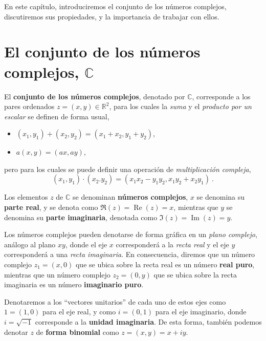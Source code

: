 En este capítulo, introduciremos el conjunto de los números complejos, discutiremos sus propiedades, y la importancia de trabajar con ellos.

\section{El conjunto de los números complejos, $\mathbb{C}$}

\begin{defi}
    El \textbf{conjunto de los números complejos}, denotado por $\mathbb{C}$, corresponde a los pares ordenados $z = (x,y) \in \mathbb{R}^2$, para los cuales la \emph{suma} y el \emph{producto por un escalar} se definen de forma usual,
    \begin{itemize}
        \item $(x_1, y_1) + (x_2, y_2) = (x_1 + x_2, y_1 + y_2)$,
        \item $a(x, y) = (ax, ay)$,
    \end{itemize}
    pero para los cuales se puede definir una operación de \emph{multiplicación compleja},
    \begin{equation}
        (x_1, y_1) \cdot (x_2. y_2) = (x_1 x_2 - y_1 y_2, x_1 y_2 + x_2 y _1) \ .
    \end{equation}

    Los elementos $z$ de $\mathbb{C}$ se denominan \textbf{números complejos}, $x$ se denomina su \textbf{parte real}, y se denota como $\Re{(z)} = \operatorname{Re}{(z)} = x$, mientras que $y$ se denomina su \textbf{parte imaginaria}, denotada como $\Im{(z)} = \operatorname{Im}{(z)} = y$.
\end{defi}

Los números complejos pueden denotarse de forma gráfica en un \emph{plano complejo}, análogo al plano $xy$, donde el eje $x$ corresponderá a la \emph{recta real} y el eje $y$ corresponderá a una \emph{recta imaginaria}. En consecuencia, diremos que un número complejo $z_1 = (x,0)$ que se ubica sobre la recta real es un número \textbf{real puro}, mientras que un número complejo $z_2 = (0, y)$ que se ubica sobre la recta imaginaria es un número \textbf{imaginario puro}. 

Denotaremos a los ``vectores unitarios'' de cada uno de estos ejes como $1 = (1,0)$ para el eje real, y como $i = (0,1)$ para el eje imaginario, donde $i = \sqrt{-1}$ corresponde a la \textbf{unidad imaginaria}. De esta forma, también podemos denotar $z$ de \textbf{forma binomial} como $z = (x,y) = x + iy$.

